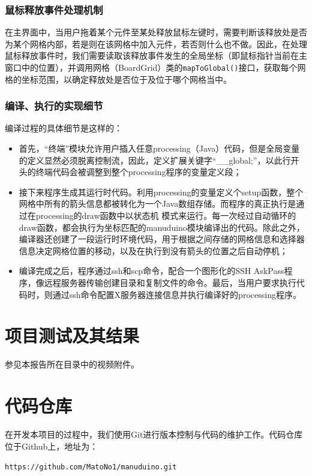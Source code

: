 \documentclass[UTF8]{ctexart}
\begin{document}
\subsubsection{鼠标释放事件处理机制}
在主界面中，当用户拖着某个元件至某处释放鼠标左键时，需要判断该释放处是否为某个网格内部，若是则在该网格中加入元件，若否则什么也不做。因此，在处理鼠标释放事件时，我们需要读取该释放事件发生的全局坐标（即鼠标指针当前在主窗口中的位置），并调用网格（BoardGrid）类的\texttt{mapToGlobal()}接口，获取每个网格的坐标范围，以确定释放处是否位于及位于哪个网格当中。\par
\subsubsection{编译、执行的实现细节}
编译过程的具体细节是这样的：
\begin{itemize}
    \item 首先，“终端”模块允许用户插入任意processing（Java）代码，但是全局变量的定义显然必须脱离控制流，因此，定义扩展关键字“\_{}\_{}global;”，以此行开头的终端代码会被调整到整个processing程序的变量定义段；
    \item 接下来程序生成其运行时代码。利用processing的变量定义个setup函数，整个网格中所有的箭头信息都被转化为一个Java数组存储。而程序的真正执行是通过在processing的draw函数中以状态机
模式来运行。每一次经过自动循环的draw函数，都会执行为坐标匹配的manuduino模块编译出的代码。除此之外，编译器还创建了一段运行时环境代码，用于根据之间存储的网格信息和选择器信息决定网格位置的移动，以及在执行到没有箭头的位置之后自动停机；
    \item 编译完成之后，程序通过ssh和scp命令，配合一个图形化的SSH AskPass程序，像远程服务器传输创建目录和复制文件的命令。最后，当用户要求执行代码时，则通过ssh命令配置X服务器连接信息并执行编译好的processing程序。
\end{itemize}

\section{项目测试及其结果}
参见本报告所在目录中的视频附件。

\section{代码仓库}
在开发本项目的过程中，我们使用Git进行版本控制与代码的维护工作。代码仓库位于Github上，地址为：\par
\texttt{https://github.com/MatoNo1/manuduino.git}
\end{document}
